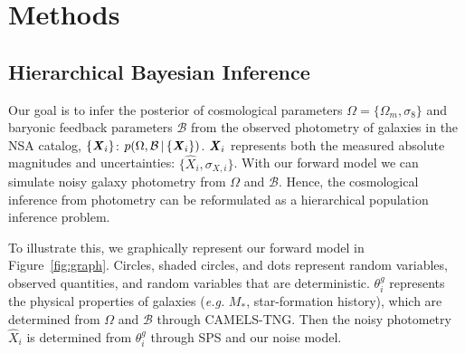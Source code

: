 \section{Methods} \label{sec:methods} 
\subsection{Hierarchical Bayesian Inference} \label{sec:hier} 
Our goal is to infer the posterior of cosmological parameters
$\Omega = \{ \Omega_m, \sigma_8 \}$ and baryonic feedback parameters
$\mathcal{B}$ from the observed photometry of galaxies in the NSA catalog,
$\{\textbf{\textit{X}}_i\}$:
$p(\Omega, \mathcal{B} \,|\, \{{\textbf{\textit{X}}_i}\})$.
${\textbf{\textit{X}}_i}$ represents both the measured absolute magnitudes and
uncertainties: $\{ \hat{X}_i, \sigma_{X,i}\}$. 
With our forward model we can simulate noisy galaxy photometry from $\Omega$
and $\mathcal{B}$. 
Hence, the cosmological inference from photometry can be reformulated as a
hierarchical population inference problem. 

To illustrate this, we graphically represent our forward model in
Figure~\ref{fig:graph}.
Circles, shaded circles, and dots represent random variables, observed
quantities, and random variables that are deterministic. 
$\theta_i^g$ represents the physical properties of galaxies (\emph{e.g.} $M_*$,
star-formation history), which are determined from $\Omega$ and $\mathcal{B}$
through CAMELS-TNG.
Then the noisy photometry $\hat{X}_i$ is determined from $\theta_i^g$ through
SPS and our noise model. 


